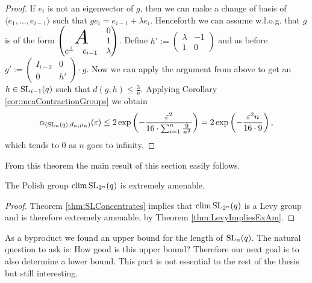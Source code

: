 \begin{proof}
	If $e_i$ is not an eigenvector of $g$, then we can make a change of basis of $\langle e_1,\dots,e_{i-1}\rangle$ such that $ge_i=e_{i-1}+\lambda e_i$. Henceforth we can assume w.l.o.g. that $g$ is of the form 
	$\begin{pmatrix}
		       &         & 0       \\
		\multicolumn{2}{c}
		{\raisebox{\dimexpr\normalbaselineskip+.2\ht\strutbox-0.9\height}[0pt][0pt]
		{\scalebox{2.3}{$A$}}} &1\\
		c^\bot & c_{i-1} & \lambda 
	\end{pmatrix}
	$.
	Define $h':=
	\begin{pmatrix}
		\lambda & -1 \\
		1       & 0  
	\end{pmatrix}
	$ and as before $g':=
	\begin{pmatrix}
		I_{i-2} & 0  \\
		0       & h' 
	\end{pmatrix}\cdot g$.
	Now we can apply the argument from above to get an $h\in \operatorname{SL}_{i-1}(q)$ such that $d(g,h)\leq\frac{3}{n}$. Applying Corollary \ref{cor:meaContractionGroups} we obtain
	\[\alpha_{(\operatorname{SL}_n(q), d_n, \mu_n)}(\varepsilon)\leq 2\exp\left(-\frac{\varepsilon^2}{16\cdot\sum_{i=1}^{n}\frac{9}{n^2}}\right)=2\exp\left(-\frac{\varepsilon^2 n}{16\cdot9}\right),\]
	which tends to 0 as $n$ goes to infinity. 
				
\end{proof}
		
From this theorem the main result of this section easily follows.
		
\begin{corollary}
	The Polish group $\operatorname{clim} \operatorname{SL}_{2^n}(q)$ is extremely amenable.
\end{corollary}
\begin{proof}
	Theorem \ref{thm:SLConcentrates} implies that $\operatorname{clim} \operatorname{SL}_{2^n}(q)$ is a Levy group and is therefore extremely amenable, by Theorem \ref{thm:LevyImpliesExAm}.
\end{proof}
		
As a byproduct we found an upper bound for the length of $\operatorname{SL}_n(q)$. The natural question to ask is: How good is this upper bound? Therefore our next goal is to also determine a lower bound. This part is not essential to the rest of the thesis but still interesting.
		
